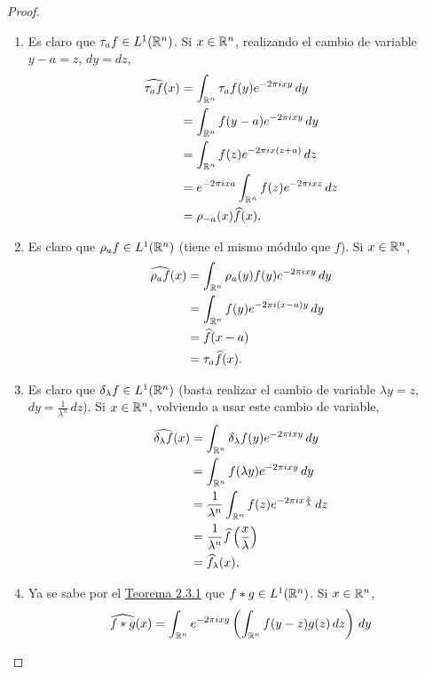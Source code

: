 \documentclass[a4paper, 11pt, oneside]{report}
\begin{document}
\begin{proof}
  \hfill
  \begin{enumerate}
    \item Es claro que $\tau_af \in L^1(\mathbb R^n)$. Si $x \in \mathbb R^n$, realizando el cambio de variable $y-a = z$, $dy = dz$,
    \[\begin{aligned}[t]
      \widehat{\tau_af}(x) &= \int_{\mathbb R^n} \tau_af(y)e^{-2\pi i xy} \, dy \\
      &= \int_{\mathbb R^n}f(y-a)e^{-2\pi i xy} \, dy \\
      &= \int_{\mathbb R^n}f(z)e^{-2\pi i x(z+a)}\, dz \\
      &= e^{-2\pi i xa} \int_{\mathbb R^n}f(z)e^{-2\pi i xz} \, dz \\
      &= \rho_{-a}(x) \widehat{f}(x),
    \end{aligned}\]
    \item Es claro que $\rho_af \in L^1(\mathbb R^n)$ (tiene el mismo módulo que $f$). Si $x \in \mathbb R^n$,
    \[\begin{aligned}[t]
      \widehat{\rho_af}(x) &= \int_{\mathbb R^n} \rho_a(y)f(y)e^{-2\pi i xy} \, dy \\
      &=\int_{\mathbb R^n} f(y)e^{-2\pi i(x-a)y} \, dy \\
      &= \widehat{f}(x-a) \\
      &= \tau_a\widehat{f}(x).
    \end{aligned}\]
    \item Es claro que $\delta_\lambda f \in L^1(\mathbb R^n)$ (basta realizar el cambio de variable $\lambda y = z$, $dy = \frac{1}{\lambda^n} \, dz$). Si $x \in \mathbb R^n$, volviendo a usar este cambio de variable,
    \[
    \begin{aligned}[t]
      \widehat{\delta_\lambda f}(x) &= \int_{\mathbb R^n} \delta_\lambda f(y)e^{-2\pi i xy} \, dy \\
      &= \int_{\mathbb R^n} f(\lambda y) e^{-2\pi i xy} \, dy \\
      &= \frac{1}{\lambda^n} \int_{\mathbb R^n} f(z)e^{-2\pi i x\frac{z}{\lambda}} \, dz \\
      &= \frac{1}{\lambda^n} \widehat{f}\left(\frac{x}{\lambda}\right) \\
      &= \widehat{f}_\lambda(x),
    \end{aligned}
    \]
    \item Ya se sabe por el \hyperref[teo:2.3.1]{\color{c1}Teorema 2.3.1} que  $f \ast g \in L^1(\mathbb R^n)$. Si $x \in \mathbb R^n$,
    \[
    \begin{aligned}[t]
      \widehat{f \ast g}(x)
      &= \int_{\R^n} e^{-2\pi i xy}\left(\int_{\R^n} f(y-z)g(z) \, dz\right) \, dy \\

\end{aligned}\]
\end{enumerate}
\end{proof}
\end{document}
